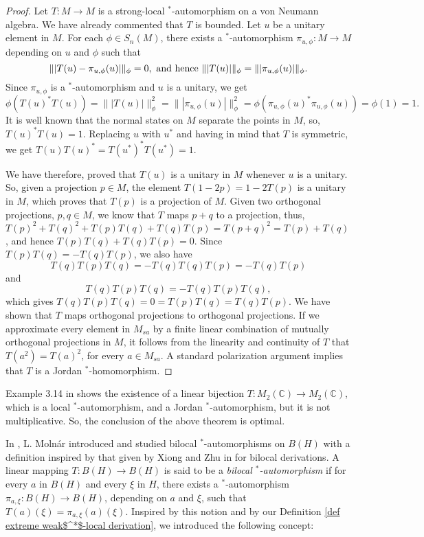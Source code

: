 \documentclass[11pt]{amsart}
\begin{document}
\begin{proof} Let $T: M\to M$ is a strong-local $^*$-automorphism on a von Neumann algebra. We have already commented that $T$ is bounded. Let $u$ be a unitary element in $M$. For each $\phi\in S_n (M)$, there exists a $^*$-automorphism $\pi_{u,\phi} : M\to M$ depending on $u$ and $\phi$ such that $$\||T(u) - \pi_{u,\phi} (u)|\|_{\phi }=0, \hbox{ and hence } \||T(u) |\|_{\phi } = \||\pi_{u,\phi} (u)|\|_{\phi }.$$
Since $\pi_{u,\phi}$ is a $^*$-automorphism and $u$ is a unitary, we get $$\phi\left( T(u)^* T(u) \right) = \||T(u) |\|_{\phi }^2
= \||\pi_{u,\phi} (u)|\|_{\phi }^2 = \phi \left(\pi_{u,\phi} (u)^* \pi_{u,\phi} (u)\right) = \phi (1) =1.$$ It is well known that the normal states on $M$ separate the points in $M$, so, $T(u)^* T(u) = 1$. Replacing $u$ with $u^*$ and having in mind that $T$ is symmetric, we get $T(u) T(u)^* = T(u^*)^* T(u^*) = 1$.\smallskip

We have therefore, proved that $T(u)$ is a unitary in $M$ whenever $u$ is a unitary. So, given a projection $p\in M$, the element $T(1-2 p ) = 1- 2 T(p)$ is a unitary in $M$, which proves that $T(p)$ is a projection of $M$.  Given two orthogonal projections, $p,q\in M$, we know that $T$ maps $p+q$ to a projection, thus, $T(p)^2 + T(q)^2 + T(p) T(q) + T(q) T(p)= T(p+q)^2 = T(p) + T(q)$, and hence $T(p) T(q) + T(q) T(p)=0$. Since $T(p) T(q) =- T(q) T(p)$, we also have $$T(q) T(p) T(q) =- T(q)  T(q) T(p) = -T(q) T(p) $$ and $$T(q) T(p) T(q) = -T(q) T(p) T(q),$$ which gives $T(q) T(p) T(q) =0= T(p) T(q) = T(q) T(p)$. We have shown that $T$ maps orthogonal projections to orthogonal projections. If we approximate every element in $M_{sa}$ by a finite linear combination of mutually orthogonal projections in $M$, it follows from the linearity and continuity of $T$ that $T(a^2 ) = T(a)^2$, for every $a\in M_{sa}$. A standard polarization argument implies that $T$ is a Jordan $^*$-homomorphism.
\end{proof}

Example 3.14 in \cite{Pe2014} shows the existence of a linear bijection $T: M_2 (\mathbb{C}) \to M_2 (\mathbb{C})$, which is a local $^*$-automorphism, and a Jordan $^*$-automorphism, but it is not multiplicative. So, the conclusion of the above theorem is optimal.\smallskip

In \cite{Mol2014}, L. Moln\'{a}r introduced and studied bilocal $^*$-automorphisms on $B(H)$ with a definition inspired by that given by Xiong and Zhu in \cite{ZhuXiong97} for bilocal derivations. A linear mapping $T: B(H) \to B(H)$ is said to be a \emph{bilocal $^*$-automorphism} if for every $a$ in $B(H)$ and every $\xi$ in $H$, there exists a $^*$-automorphism $\pi_{a,\xi}: B(H)\to B(H)$, depending on $a$ and $\xi$, such that $T(a) (\xi) = \pi_{a,\xi} (a) (\xi)$. Inspired by this notion and by our Definition \ref{def extreme weak$^*$-local derivation}, we introduced the following concept:
\end{document}
